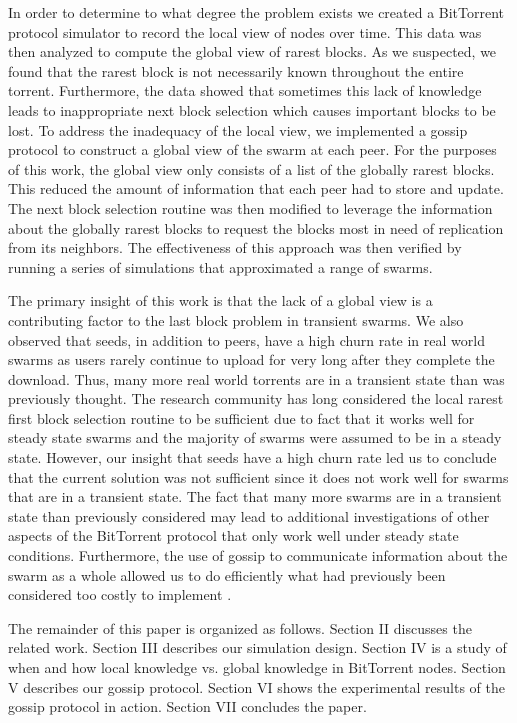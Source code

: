 In order to determine to what degree the problem exists we created a BitTorrent
protocol simulator to record the local view of nodes over time. This data was then
analyzed to compute the global view of rarest blocks. As we suspected,
we found that the rarest block is not necessarily known throughout the
entire torrent. Furthermore, the data showed that sometimes this lack
of knowledge leads to inappropriate next block selection which causes
important blocks to be lost. To address the inadequacy of the local view,
we implemented a gossip protocol to construct a global view of
the swarm at each peer. For the purposes of this work, the global view
only consists of a list of the globally rarest blocks. This reduced the
amount of information that each peer had to store and update. The next block
selection routine was then modified to leverage the information
about the globally rarest blocks to request the blocks most in need
of replication from its neighbors. The effectiveness of this approach
was then verified by running a series of simulations that
approximated a range of swarms.


The primary insight of this work is that the lack of a global view
is a contributing factor to the last block problem in transient
swarms. We also observed that seeds, in addition to peers, have a high
churn rate in real world swarms as users rarely continue to upload for
very long after they complete the download. Thus, many more real world
torrents are in a transient state than was previously thought. The
research community has long considered the local rarest first block
selection routine to be sufficient due to fact that it works well for
steady state swarms and the majority of swarms were assumed to be in
a steady state. However, our insight that seeds have a high churn rate
led us to conclude that the current solution was not sufficient since
it does not work well for swarms that are in a transient state. The fact
that many more swarms are in a transient state than previously considered
may lead to additional investigations of other aspects of the BitTorrent
protocol that only work well under steady state conditions. Furthermore,
the use of gossip to communicate information about the swarm as a whole
allowed us to do efficiently what had previously been considered too
costly to implement \cite{cohen:1}.


The remainder of this paper is organized as follows. Section II discusses
the related work. Section III describes our simulation design.
Section IV is a study of when and how
local knowledge vs. global knowledge in BitTorrent nodes.
Section V describes our gossip protocol. Section VI
shows the experimental results of the gossip protocol in action. Section VII
concludes the paper.
